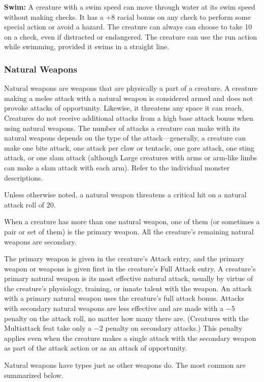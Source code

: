 \textbf{Swim:} A creature with a swim speed can move through water at its swim speed without making  checks. It has a +8 racial bonus on any  check to perform some special action or avoid a hazard. The creature can always can choose to take 10 on a  check, even if distracted or endangered. The creature can use the run action while swimming, provided it swims in a straight line.

\subsubsection{Natural Weapons}
Natural weapons are weapons that are physically a part of a creature. A creature making a melee attack with a natural weapon is considered armed and does not provoke attacks of opportunity. Likewise, it threatens any space it can reach. Creatures do not receive additional attacks from a high base attack bonus when using natural weapons. The number of attacks a creature can make with its natural weapons depends on the type of the attack---generally, a creature can make one bite attack, one attack per claw or tentacle, one gore attack, one sting attack, or one slam attack (although Large creatures with arms or arm-like limbs can make a slam attack with each arm). Refer to the individual monster descriptions.

Unless otherwise noted, a natural weapon threatens a critical hit on a natural attack roll of 20.

When a creature has more than one natural weapon, one of them (or sometimes a pair or set of them) is the primary weapon. All the creature's remaining natural weapons are secondary.

The primary weapon is given in the creature's Attack entry, and the primary weapon or weapons is given first in the creature's Full Attack entry. A creature's primary natural weapon is its most effective natural attack, usually by virtue of the creature's physiology, training, or innate talent with the weapon. An attack with a primary natural weapon uses the creature's full attack bonus. Attacks with secondary natural weapons are less effective and are made with a $-5$ penalty on the attack roll, no matter how many there are. (Creatures with the Multiattack feat take only a $-2$ penalty on secondary attacks.) This penalty applies even when the creature makes a single attack with the secondary weapon as part of the attack action or as an attack of opportunity.

Natural weapons have types just as other weapons do. The most common are summarized below.

